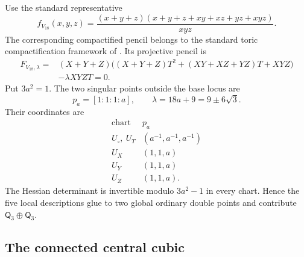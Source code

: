 \documentclass[11pt]{amsart}
\theoremstyle{definition}
\theoremstyle{remark}
\newcommand{\MorseCat}[1]{\mathsf{Q}_{#1}}
\begin{document}
Use the standard representative
\begin{equation}
\label{eq:V18_torus}
f_{V_{18}}(x,y,z)
=\frac{(x+y+z)(x+y+z+xy+xz+yz+xyz)}{xyz}.
\end{equation}
The corresponding compactified pencil belongs to the standard toric
compactification framework of
\cite{PrzyjalkowskiWeak,PrzyjalkowskiCY,PrzyjalkowskiToric}.
Its projective pencil is
\begin{equation}
\label{eq:V18_pencil}
\begin{split}
F_{V_{18},\lambda}
={}&(X+Y+Z)
\bigl((X+Y+Z)T^2+(XY+XZ+YZ)T+XYZ\bigr)\\
&-\lambda XYZT=0.
\end{split}
\end{equation}
Put $3a^2=1$.  The two singular points outside the base locus are
\begin{equation}
\label{eq:V18_nodes}
p_a=[1:1:1:a],
\qquad
\lambda=18a+9=9\pm6\sqrt3.
\end{equation}
Their coordinates are
\[
\begin{array}{c|c}
\text{chart}&p_a\\ \hline
U_\circ,\ U_T&(a^{-1},a^{-1},a^{-1})\\
U_X&(1,1,a)\\
U_Y&(1,1,a)\\
U_Z&(1,1,a).
\end{array}
\]
The Hessian determinant is invertible modulo $3a^2-1$ in every chart.  Hence
the five local descriptions glue to two global ordinary double points and
contribute $\MorseCat{3}\oplus\MorseCat{3}$.

\subsection{The connected central cubic}
\end{document}

